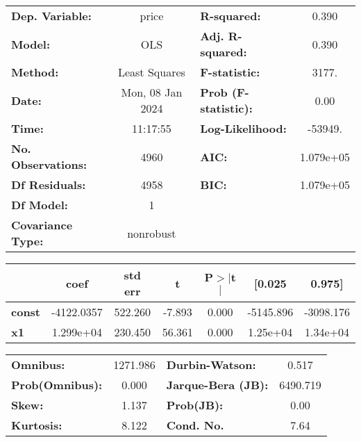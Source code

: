 \documentclass[
  letterpaper,
  DIV=11,
  numbers=noendperiod]{scrreprt}
\begin{document}
\begin{center}
\begin{tabular}{lclc}
\toprule
\textbf{Dep. Variable:}    &      price       & \textbf{  R-squared:         } &     0.390   \\
\textbf{Model:}            &       OLS        & \textbf{  Adj. R-squared:    } &     0.390   \\
\textbf{Method:}           &  Least Squares   & \textbf{  F-statistic:       } &     3177.   \\
\textbf{Date:}             & Mon, 08 Jan 2024 & \textbf{  Prob (F-statistic):} &     0.00    \\
\textbf{Time:}             &     11:17:55     & \textbf{  Log-Likelihood:    } &   -53949.   \\
\textbf{No. Observations:} &        4960      & \textbf{  AIC:               } & 1.079e+05   \\
\textbf{Df Residuals:}     &        4958      & \textbf{  BIC:               } & 1.079e+05   \\
\textbf{Df Model:}         &           1      & \textbf{                     } &             \\
\textbf{Covariance Type:}  &    nonrobust     & \textbf{                     } &             \\
\bottomrule
\end{tabular}
\begin{tabular}{lcccccc}
               & \textbf{coef} & \textbf{std err} & \textbf{t} & \textbf{P$> |$t$|$} & \textbf{[0.025} & \textbf{0.975]}  \\
\midrule
\textbf{const} &   -4122.0357  &      522.260     &    -7.893  &         0.000        &    -5145.896    &    -3098.176     \\
\textbf{x1}    &    1.299e+04  &      230.450     &    56.361  &         0.000        &     1.25e+04    &     1.34e+04     \\
\bottomrule
\end{tabular}
\begin{tabular}{lclc}
\textbf{Omnibus:}       & 1271.986 & \textbf{  Durbin-Watson:     } &    0.517  \\
\textbf{Prob(Omnibus):} &   0.000  & \textbf{  Jarque-Bera (JB):  } & 6490.719  \\
\textbf{Skew:}          &   1.137  & \textbf{  Prob(JB):          } &     0.00  \\
\textbf{Kurtosis:}      &   8.122  & \textbf{  Cond. No.          } &     7.64  \\
\bottomrule
\end{tabular}
\end{center}
\end{document}
